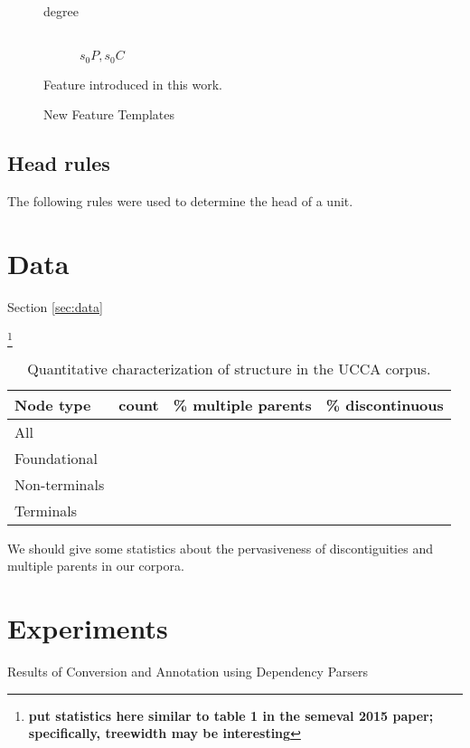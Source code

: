 \documentclass[11pt]{article}
\newcommand{\my}[1]{\footnote{\bf #1}}
\newcommand{\secref}[1]{Section \ref{#1}}
\begin{document}
\begin{figure}[t]
\begin{description}
	\item[degree] \hfill \\
	$s_0P, s_0C$
\end{description}
\caption{New Feature Templates}
\medskip
\small
Feature introduced in this work.
\label{fig:new_features}
\end{figure}

\subsection{Head rules}
\label{subsec:head_rules}

The following rules were used to determine the head of a unit.

\section{Data}\secref{sec:data}

\my{put statistics here similar to table 1 in the semeval 2015 paper; specifically, treewidth may be interesting}

\begin{table}[ht]
\begin{tabular}{lccc}
Node type & count & \% multiple parents & \% discontinuous \\
\hline
All &  & \\
Foundational &  & \\
Non-terminals &  & \\
Terminals &  &
\end{tabular}
\caption{Quantitative characterization of structure in the UCCA corpus. 
}
\end{table}

We should give some statistics about the pervasiveness of discontiguities and multiple parents in our corpora.

\section{Experiments}

\begin{table*}
\caption{Results of Conversion and Annotation using Dependency Parsers}
\label{table:convert}
\end{table*}
\end{document}
